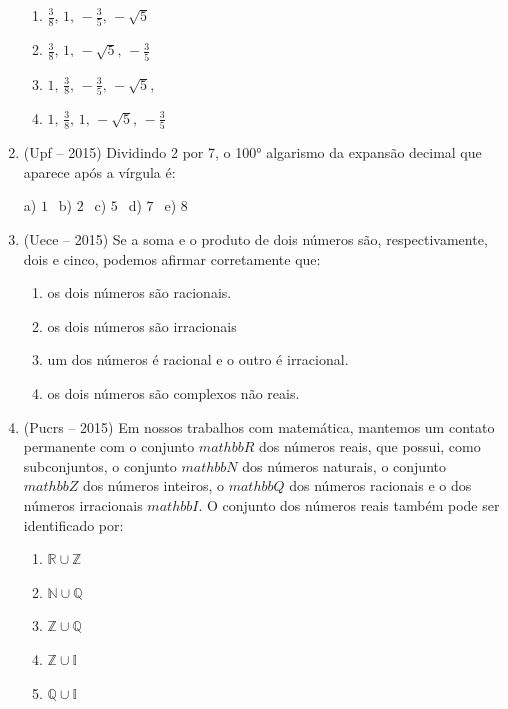 \begin{multicols*}{2}
\begin{enumerate}
              \begin{enumerate}

                  \item $\frac{3}{8},\, 1,\,- \frac{3}{5},\, -\sqrt{5}$
                  \item $\frac{3}{8},\, 1,\,-\sqrt{5},\, - \frac{3}{5}$
                  \item $1,\, \frac{3}{8},\, - \frac{3}{5},\, -\sqrt{5},$
                  \item $1,\, \frac{3}{8},\, 1,\, -\sqrt{5},\, - \frac{3}{5}$

              \end{enumerate}

        \item (Upf – 2015) Dividindo 2 por 7, o 100° algarismo da expansão decimal que aparece após a vírgula é:

              a) $ 1 \ \ $ b) $ 2 \ \ $ c) $ 5 \ \ $ d) $ 7 \ \ $ e) $ 8 \ \ $

        \item (Uece – 2015) Se a soma e o produto de dois números são, respectivamente, dois e cinco, podemos afirmar corretamente que:

              \begin{enumerate}

                  \item  os dois números são racionais.
                  \item  os dois números são irracionais
                  \item  um dos números é racional e o outro é irracional.
                  \item  os dois números são complexos não reais.

              \end{enumerate}

        \item (Pucrs – 2015) Em nossos trabalhos com matemática, mantemos um contato permanente com o conjunto $ mathbb{R} $ dos números reais, que possui, como subconjuntos, o conjunto $ mathbb{N} $ dos números naturais, o conjunto $ mathbb{Z} $ dos números inteiros, o $ mathbb{Q} $ dos números racionais e o dos números irracionais $ mathbb{I} $. O conjunto dos números reais também pode ser identificado por:

              \begin{enumerate}

                  \item $ \mathbb{R} \cup \mathbb{Z} $
                  \item $ \mathbb{N} \cup \mathbb{Q} $
                  \item $ \mathbb{Z} \cup \mathbb{Q} $
                  \item $ \mathbb{Z} \cup \mathbb{I} $
                  \item $ \mathbb{Q} \cup \mathbb{I} $


\end{enumerate}
\end{enumerate}
\end{multicols*}
